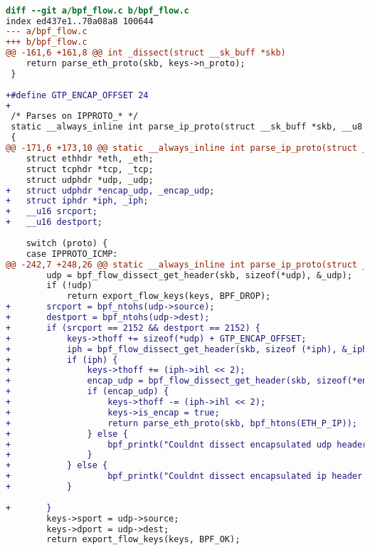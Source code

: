 \begin{lstlisting}[language=diff, caption = {Patch to remove GTP Headers for the BPF Flow Dissector Example in the Linux Kernel}, label = {lst:patch} ]

diff --git a/bpf_flow.c b/bpf_flow.c
index ed437e1..70a08a8 100644
--- a/bpf_flow.c
+++ b/bpf_flow.c
@@ -161,6 +161,8 @@ int _dissect(struct __sk_buff *skb)
 	return parse_eth_proto(skb, keys->n_proto);
 }
 
+#define GTP_ENCAP_OFFSET 24
+
 /* Parses on IPPROTO_* */
 static __always_inline int parse_ip_proto(struct __sk_buff *skb, __u8 proto)
 {
@@ -171,6 +173,10 @@ static __always_inline int parse_ip_proto(struct __sk_buff *skb, __u8 proto)
 	struct ethhdr *eth, _eth;
 	struct tcphdr *tcp, _tcp;
 	struct udphdr *udp, _udp;
+	struct udphdr *encap_udp, _encap_udp;
+	struct iphdr *iph, _iph;
+	__u16 srcport;
+	__u16 destport;
 
 	switch (proto) {
 	case IPPROTO_ICMP:
@@ -242,7 +248,26 @@ static __always_inline int parse_ip_proto(struct __sk_buff *skb, __u8 proto)
 		udp = bpf_flow_dissect_get_header(skb, sizeof(*udp), &_udp);
 		if (!udp)
 			return export_flow_keys(keys, BPF_DROP);
+		srcport = bpf_ntohs(udp->source);
+		destport = bpf_ntohs(udp->dest);
+		if (srcport == 2152 && destport == 2152) {
+			keys->thoff += sizeof(*udp) + GTP_ENCAP_OFFSET;
+			iph = bpf_flow_dissect_get_header(skb, sizeof (*iph), &_iph);
+			if (iph) {
+				keys->thoff += (iph->ihl << 2);
+				encap_udp = bpf_flow_dissect_get_header(skb, sizeof(*encap_udp), &_encap_udp);
+				if (encap_udp) {
+					keys->thoff -= (iph->ihl << 2);
+					keys->is_encap = true;
+					return parse_eth_proto(skb, bpf_htons(ETH_P_IP));
+				} else {
+					bpf_printk("Couldnt dissect encapsulated udp header");
+				}
+			} else {
+					bpf_printk("Couldnt dissect encapsulated ip header at GTP offset (%d bytes)", keys->thoff);
+			}
 
+		}
 		keys->sport = udp->source;
 		keys->dport = udp->dest;
 		return export_flow_keys(keys, BPF_OK);


\end{lstlisting}
